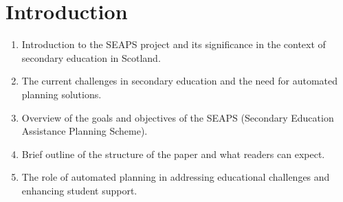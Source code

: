 \section{Introduction}
\begin{enumerate}
    \item Introduction to the SEAPS project and its significance in the context of secondary education in Scotland.
    \item The current challenges in secondary education and the need for automated planning solutions.
    \item Overview of the goals and objectives of the SEAPS (Secondary Education Assistance Planning Scheme).
    \item Brief outline of the structure of the paper and what readers can expect.
    \item The role of automated planning in addressing educational challenges and enhancing student support.
\end{enumerate}